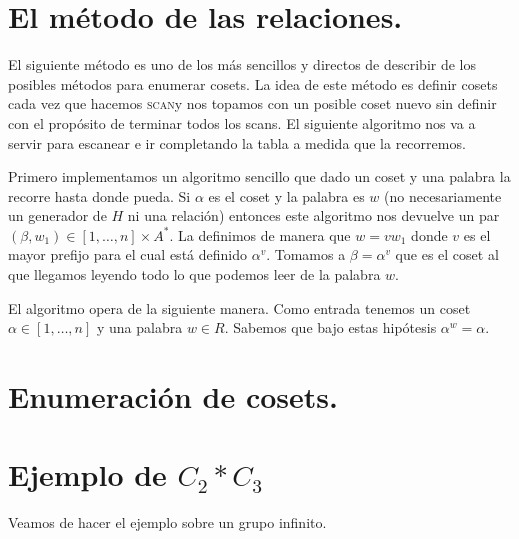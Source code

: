 \documentclass[tesis.tex]{subfiles}
\newcommand{\coin}{\textsc{coincidencia}}
\newcommand{\scan}{\textsc{scan}}
\newcommand{\definir}{\textsc{definir}}
\newcommand{\scanfill}{\textsc{scanandfill}}
\newcommand{\ded}{\textsc{deducir}}
\newcommand{\recorrer}{\textsc{recorrer}}
\begin{document}
\section{El método de las relaciones.}

El siguiente método es uno de los más sencillos y directos de describir de los posibles métodos para enumerar cosets.
La idea de este método es definir cosets cada vez que hacemos \scan y nos topamos con un posible coset nuevo sin definir con el propósito de terminar todos los scans.
El siguiente algoritmo nos va a servir para escanear e ir completando la tabla a medida que la recorremos.


Primero implementamos un algoritmo sencillo que dado un coset y una palabra la recorre hasta donde pueda.
Si $\alpha$ es el coset y la palabra es $w$ (no necesariamente un generador de $H$ ni una relación) entonces este algoritmo nos devuelve un par $(\beta, w_1) \in [1, \dots, n] \times A^{*}$.
La definimos de manera que $w = vw_1$ donde $v$ es el mayor prefijo para el cual está definido $\alpha^v$.
Tomamos a $\beta = \alpha^v$ que es el coset al que llegamos leyendo todo lo que podemos leer de la palabra $w$.


El algoritmo opera de la siguiente manera.
Como entrada tenemos un coset $\alpha \in [1, \dots, n]$ y una palabra $w \in R$.
Sabemos que bajo estas hipótesis $\alpha^w = \alpha$.




\section{Enumeración de cosets.}



\section{Ejemplo de $C_2 \ast C_3$}
Veamos de hacer el ejemplo sobre un grupo infinito.
\end{document}
